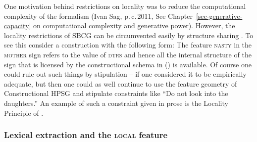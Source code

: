 
One motivation behind restrictions on locality was to reduce the computational complexity of the
formalism (Ivan Sag, p.\,c.\,2011, See Chapter~\ref{sec-generative-capacity} on computational complexity and generative power).
However, the locality restrictions of SBCG can be circumvented easily by structure sharing \citep[Section~9.6.1]{MuellerGTBuch2}. To see this consider a
construction with the following form:
\ea
{}
\z
The feature \textsc{nasty} in the \textsc{mother} sign refers to the value of \textsc{dtrs} and hence all the
internal structure of the sign that is licensed by the constructional schema in () is
available. Of course one could rule out such things by stipulation -- if one considered it
to be empirically adequate, but then one could as well continue to use the feature geometry of
Constructional HPSG \citep{Sag97a} and stipulate constraints like ``Do not look into the
daughters.'' An example of such a constraint given in prose is the Locality Principle of \citet[--144]{ps}.

\subsubsection{Lexical extraction and the \textsc{local} feature}
\label{sec-sbcg-local-feature}


